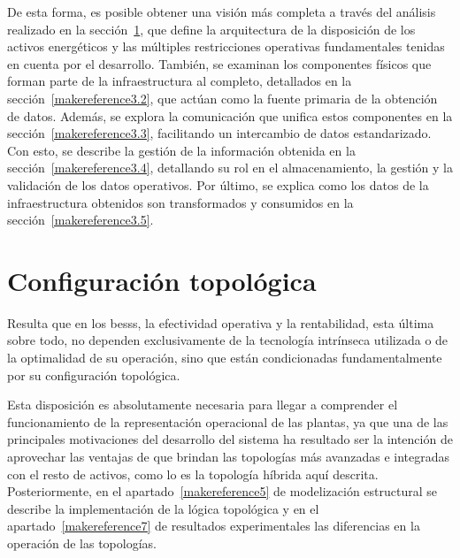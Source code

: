 De esta forma, es posible obtener una visión más completa a través del análisis realizado en la sección~\ref{makereference3.1}, que define la arquitectura de la disposición de los activos energéticos y las múltiples restricciones operativas fundamentales tenidas en cuenta por el desarrollo. También, se examinan los componentes físicos que forman parte de la infraestructura al completo, detallados en la sección~\ref{makereference3.2}, que actúan como la fuente primaria de la obtención de datos. Además, se explora la comunicación que unifica estos componentes en la sección~\ref{makereference3.3},  facilitando un intercambio de datos estandarizado. Con esto, se describe la gestión de la información obtenida en la sección~\ref{makereference3.4}, detallando su rol en el almacenamiento, la gestión y la validación de los datos operativos. Por último, se explica como los datos de la infraestructura obtenidos son transformados y consumidos en la sección~\ref{makereference3.5}.


\section{Configuración topológica}%
\label{makereference3.1}

Resulta que en los \glspl{bess}, la efectividad operativa y la rentabilidad, esta última sobre todo, no dependen exclusivamente de la tecnología intrínseca utilizada o de la optimalidad de su operación, sino que están condicionadas fundamentalmente por su configuración topológica.

Esta disposición es absolutamente necesaria para llegar a comprender el funcionamiento de la representación operacional de las plantas, ya que una de las principales motivaciones del desarrollo del sistema ha resultado ser la intención de aprovechar las ventajas de que brindan las topologías más avanzadas e integradas con el resto de activos, como lo es la topología híbrida aquí descrita. Posteriormente, en el apartado~\ref{makereference5} de modelización estructural se describe la implementación de la lógica topológica y en el apartado~\ref{makereference7} de resultados experimentales las diferencias en la operación de las topologías.

